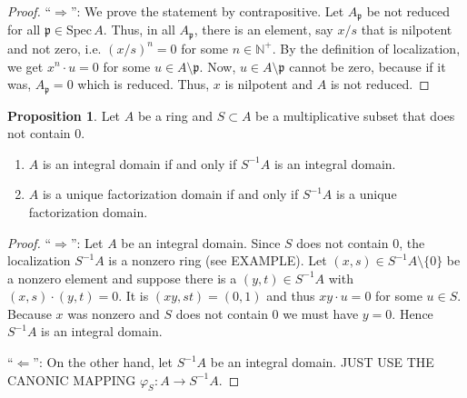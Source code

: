 \documentclass[a4paper]{book}
\theoremstyle{definition}
\newtheorem{proposition}[definition]{Proposition}
\begin{document}
\begin{proof}
    ``\(\Rightarrow\)'': We prove the statement by contrapositive. Let \(A_\mathfrak{p}\) be not reduced for all \(\mathfrak{p} \in \mathrm{Spec} \, A\). Thus, in all \(A_\mathfrak{p}\), there is an element, say \(x / s\) that is nilpotent and not zero, i.e. \((x / s)^n = 0\) for some \(n \in \mathbb{N}^+\). By the definition of localization, we get \(x^n \cdot u = 0\) for some \(u \in A \setminus \mathfrak{p}\). Now, \(u \in A \setminus \mathfrak{p}\) cannot be zero, because if it was, \(A_\mathfrak{p} = 0\) which is reduced. Thus, \(x\) is nilpotent and \(A\) is not reduced.
\end{proof}








\begin{thmbox}
    \begin{proposition}
        Let \(A\) be a ring and \(S \subset A\) be a multiplicative subset that does not contain \(0\).
        
        \begin{enumerate}
            \item \(A\) is an integral domain if and only if \(S^{-1}A\) is an integral domain.
            \item \(A\) is a unique factorization domain if and only if \(S^{-1}A\) is a unique factorization domain.
        \end{enumerate}
    \end{proposition}
\end{thmbox}



\begin{proof}
    ``\(\Rightarrow\)'': Let \(A\) be an integral domain. Since \(S\) does not contain \(0\), the localization \(S^{-1}A\) is a nonzero ring (see EXAMPLE). Let \((x, s) \in S^{-1}A \setminus \{0\}\) be a nonzero element and suppose there is a \((y, t) \in S^{-1}A\) with \((x, s) \cdot (y, t) = 0\). It is \((xy, st) = (0, 1)\) and thus \(xy \cdot u = 0\) for some \(u \in S\). Because \(x\) was nonzero and \(S\) does not contain \(0\) we must have \(y = 0\). Hence \(S^{-1}A\) is an integral domain.

    ``\(\Leftarrow\)'': On the other hand, let \(S^{-1}A\) be an integral domain. JUST USE THE CANONIC MAPPING \(\varphi_S: A \longrightarrow S^{-1}A\).
\end{proof}
\end{document}
